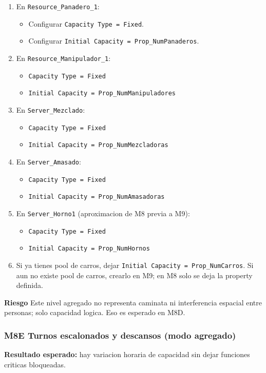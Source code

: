 \documentclass[11pt]{article}
\newcommand{\simio}[1]{\texttt{#1}}
\newcommand{\risk}{\textcolor{rojoriesgo}{\textbf{Riesgo}}}
\begin{document}
\begin{enumerate}
  \item En \simio{Resource\_Panadero\_1}:
  \begin{itemize}
    \item Configurar \simio{Capacity Type = Fixed}.
    \item Configurar \simio{Initial Capacity = Prop\_NumPanaderos}.
  \end{itemize}
  \item En \simio{Resource\_Manipulador\_1}:
  \begin{itemize}
    \item \simio{Capacity Type = Fixed}
    \item \simio{Initial Capacity = Prop\_NumManipuladores}
  \end{itemize}
  \item En \simio{Server\_Mezclado}:
  \begin{itemize}
    \item \simio{Capacity Type = Fixed}
    \item \simio{Initial Capacity = Prop\_NumMezcladoras}
  \end{itemize}
  \item En \simio{Server\_Amasado}:
  \begin{itemize}
    \item \simio{Capacity Type = Fixed}
    \item \simio{Initial Capacity = Prop\_NumAmasadoras}
  \end{itemize}
  \item En \simio{Server\_Horno1} (aproximacion de M8 previa a M9):
  \begin{itemize}
    \item \simio{Capacity Type = Fixed}
    \item \simio{Initial Capacity = Prop\_NumHornos}
  \end{itemize}
  \item Si ya tienes pool de carros, dejar \simio{Initial Capacity = Prop\_NumCarros}. Si aun no existe pool de carros, crearlo en M9; en M8 solo se deja la property definida.
\end{enumerate}

\risk{} Este nivel agregado no representa caminata ni interferencia espacial entre personas; solo capacidad logica. Eso es esperado en M8D.

\subsubsection{M8E Turnos escalonados y descansos (modo agregado)}
\textbf{Resultado esperado:} hay variacion horaria de capacidad sin dejar funciones criticas bloqueadas.
\end{document}
